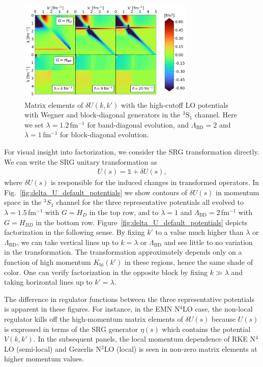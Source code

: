 \documentclass[10pt,aps,prc,floatfix,twocolumn,nofootinbib]{revtex4-1}
\newcommand{\LambdaBD}{{\Lambda_{\text{BD}}}}
\newcommand{\Khi}{K_{\text{hi}}}
\begin{document}
\begin{figure}[tbh]
	\includegraphics[clip,width=0.75\textwidth]{unitary_transformation_contours_kvnns_900_901_902_lamb1p2_Lamb2p0.png}%
    \caption{Matrix elements of $\delta U(k,k')$ with the high-cutoff LO potentials with Wegner and block-diagonal generators in the $^3$S$_1$ channel. Here we set $\lambda=1.2$\,fm$^{-1}$ for band-diagonal evolution, and $\LambdaBD=2$ and $\lambda=1$\,fm$^{-1}$ for block-diagonal evolution.}
	\label{fig:delta_U_high_cutoffs}
\end{figure}
%

For visual insight into factorization, we consider the SRG transformation directly.
We can write the SRG unitary transformation as
%
\begin{eqnarray}
    \label{eq:delta_U}
    U(s) = \mathbb{1} + \delta U(s),
\end{eqnarray}
%
where $\delta U(s)$ is responsible for the induced changes in transformed operators.
In Fig.~\ref{fig:delta_U_default_potentials} we show contours of $\delta U(s)$ in momentum space in the $^{3}S_1$ channel for the three representative potentials all evolved to $\lambda=1.5$\,fm$^{-1}$ with $G=H_D$ in the top row, and to $\lambda=1$ and $\LambdaBD=2$\,fm$^{-1}$ with $G=H_{BD}$ in the bottom row.
Figure~\ref{fig:delta_U_default_potentials} depicts factorization in the following sense.
By fixing $k'$ to a value much higher than $\lambda$ or $\LambdaBD$, we can take vertical lines up to $k=\lambda$ or $\LambdaBD$ and see little to no variation in the transformation.
The transformation approximately depends only on a function of high momentum $\Khi(k')$ in these regions, hence the same shade of color.
One can verify factorization in the opposite block by fixing $k \gg \lambda$ and taking horizontal lines up to $k'=\lambda$.


The difference in regulator functions between the three representative potentials is apparent in these figures.
For instance, in the EMN N$^4$LO case, the non-local regulator kills off the high-momentum matrix elements of $\delta U(s)$ because $U(s)$ is expressed in terms of the SRG generator $\eta(s)$ which contains the potential $V(k,k')$.
In the subsequent panels, the local momentum dependence of RKE N$^4$LO (semi-local) and Gezerlis N$^2$LO (local) is seen in non-zero matrix elements at higher momentum values.
\end{document}
